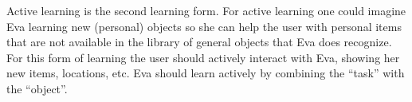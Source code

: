\documentclass[project_eva.tex]{subfiles}
\begin{document}
Active learning is the second learning form. For active learning one could imagine Eva learning new (personal) objects so 
she can help the user with personal items that are not available in the library of general objects that Eva does recognize. 
For this form of learning the user should actively interact with Eva, showing her new items, locations, etc. Eva should 
learn actively by combining the ``task'' with the ``object''. 
\end{document}
